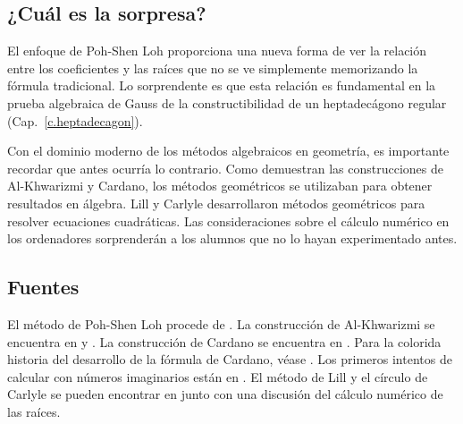 \subsection*{¿Cuál es la sorpresa?}

El enfoque de Poh-Shen Loh proporciona una nueva forma de ver la relación entre los coeficientes y las raíces que no se ve simplemente memorizando la fórmula tradicional. Lo sorprendente es que esta relación es fundamental en la prueba algebraica de Gauss de la constructibilidad de un heptadecágono regular (Cap.~\ref{c.heptadecagon}).

Con el dominio moderno de los métodos algebraicos en geometría, es importante recordar que antes ocurría lo contrario. Como demuestran las construcciones de Al-Khwarizmi y Cardano, los métodos geométricos se utilizaban para obtener resultados en álgebra. Lill y Carlyle desarrollaron métodos geométricos para resolver ecuaciones cuadráticas. Las consideraciones sobre el cálculo numérico en los ordenadores sorprenderán a los alumnos que no lo hayan experimentado antes.

\subsection*{Fuentes}

El método de Poh-Shen Loh procede de \cite{loh1,loh2}. La construcción de Al-Khwarizmi se encuentra en \cite[Cap.~1]{jorg} y \cite{mastin}. La construcción de Cardano se encuentra en \cite[Cap.~1]{jorg}. Para la colorida historia del desarrollo de la fórmula de Cardano, véase \cite{wiki:cardano}. Los primeros intentos de calcular con números imaginarios están en \cite[Cap.~2]{jorg}. El método de Lill y el círculo de Carlyle se pueden encontrar en \cite{wiki:quadratic} junto con una discusión del cálculo numérico de las raíces.
